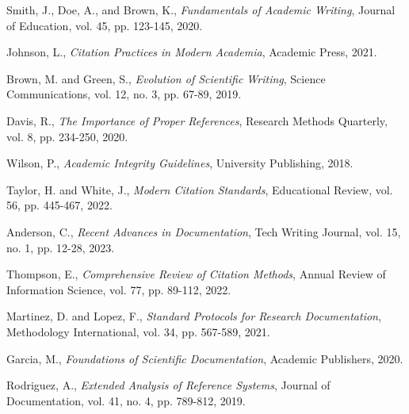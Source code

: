 \documentclass[12pt]{article}
\begin{document}
\begin{thebibliography}{99}

Smith, J., Doe, A., and Brown, K.,
\textit{Fundamentals of Academic Writing},
Journal of Education, vol. 45, pp. 123-145, 2020.

Johnson, L.,
\textit{Citation Practices in Modern Academia},
Academic Press, 2021.

Brown, M. and Green, S.,
\textit{Evolution of Scientific Writing},
Science Communications, vol. 12, no. 3, pp. 67-89, 2019.

Davis, R.,
\textit{The Importance of Proper References},
Research Methods Quarterly, vol. 8, pp. 234-250, 2020.

Wilson, P.,
\textit{Academic Integrity Guidelines},
University Publishing, 2018.

Taylor, H. and White, J.,
\textit{Modern Citation Standards},
Educational Review, vol. 56, pp. 445-467, 2022.

Anderson, C.,
\textit{Recent Advances in Documentation},
Tech Writing Journal, vol. 15, no. 1, pp. 12-28, 2023.

Thompson, E.,
\textit{Comprehensive Review of Citation Methods},
Annual Review of Information Science, vol. 77, pp. 89-112, 2022.

Martinez, D. and Lopez, F.,
\textit{Standard Protocols for Research Documentation},
Methodology International, vol. 34, pp. 567-589, 2021.

Garcia, M.,
\textit{Foundations of Scientific Documentation},
Academic Publishers, 2020.

Rodriguez, A.,
\textit{Extended Analysis of Reference Systems},
Journal of Documentation, vol. 41, no. 4, pp. 789-812, 2019.

\end{thebibliography}
\end{document}
